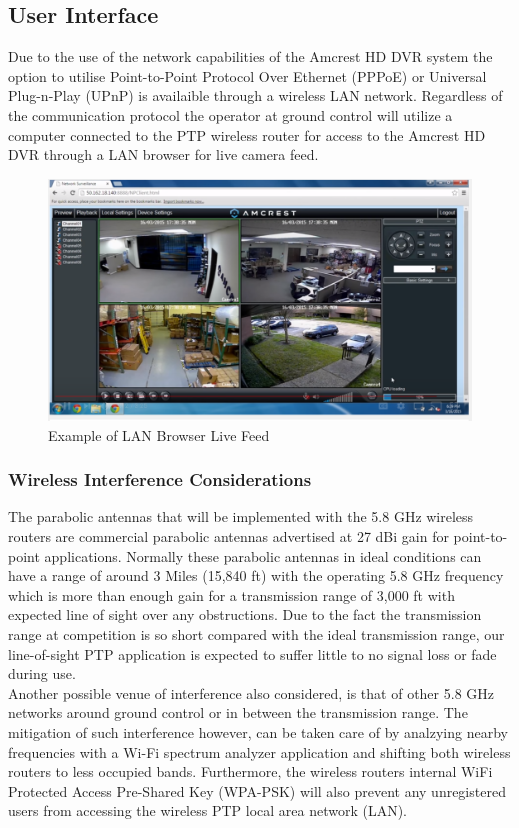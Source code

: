 \documentclass[10pt,a4paper]{article}
\begin{document}
\subsection{User Interface}
Due to the use of the network capabilities of the Amcrest HD DVR system the option to utilise Point-to-Point Protocol Over Ethernet (PPPoE) or Universal Plug-n-Play (UPnP) is availaible through a wireless LAN network. Regardless of the communication protocol the operator at ground control will utilize a computer connected to the PTP wireless router for access to the Amcrest HD DVR through a LAN browser for live camera feed.
\begin{figure}[h!]
	\centering
	\includegraphics[width=.9\textwidth]{./figs/AmcrestBrowser.png}
	\caption{Example of LAN Browser Live Feed}
	\label{fig:example}
\end{figure}
\subsubsection{Wireless Interference Considerations}
The parabolic antennas that will be implemented with the 5.8 GHz wireless routers are commercial parabolic antennas advertised at 27 dBi gain for point-to-point applications. Normally these parabolic antennas in ideal conditions can have a range of around 3 Miles (15,840 ft) with the operating 5.8 GHz frequency which is more than enough gain for a transmission range of 3,000 ft with expected line of sight over any obstructions. Due to the fact the transmission range at competition is so short compared with the ideal transmission range, our line-of-sight PTP application is expected to suffer little to no signal loss or fade during use.\\
Another possible venue of interference also considered, is that of other 5.8 GHz networks around ground control or in between the transmission range. The mitigation of such interference however, can be taken care of by analzying nearby frequencies with a Wi-Fi spectrum analyzer application and shifting both wireless routers to less occupied bands. Furthermore, the wireless routers internal WiFi Protected Access Pre-Shared Key (WPA-PSK) will also prevent any unregistered users from accessing the wireless PTP local area network (LAN).
\end{document}
